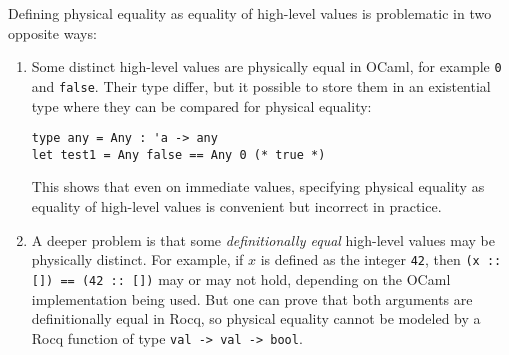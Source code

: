 Defining physical equality as equality of high-level values is problematic in two opposite ways:
\begin{enumerate}
\item Some distinct high-level values are physically equal in OCaml, for example \texttt{0} and \texttt{false}. Their type differ, but it possible to store them in an existential type where they can be compared for physical equality:

\begin{verbatim}
type any = Any : 'a -> any
let test1 = Any false == Any 0 (* true *)
\end{verbatim}

This shows that even on immediate values, specifying physical equality as equality of high-level values is convenient but incorrect in practice.

\item A deeper problem is that some \emph{definitionally equal} high-level values may be physically distinct.
  For example, if $x$ is defined as the integer \texttt{42}, then \texttt{(x :: []) == (42 :: [])} may or may not   hold, depending on the OCaml implementation being used.
  But one can prove that both arguments are definitionally equal in Rocq, so physical equality cannot be modeled by a Rocq function of type \texttt{val -> val -> bool}.
\end{enumerate}
